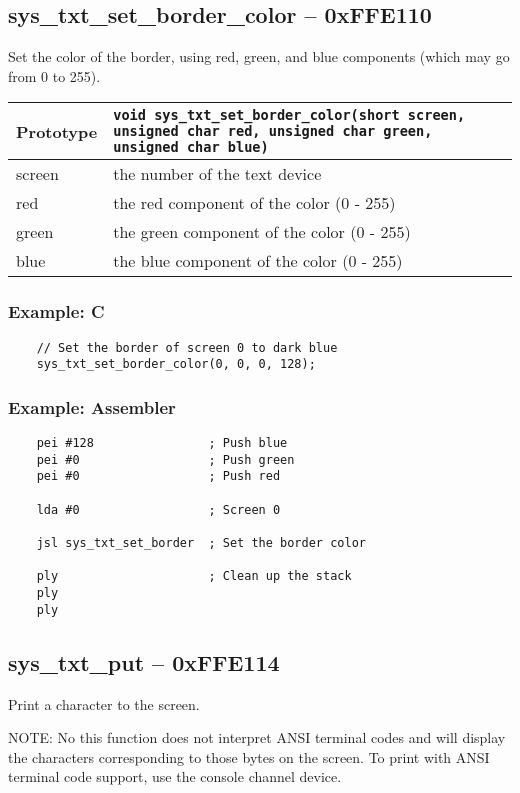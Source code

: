 \subsection*{sys\_txt\_set\_border\_color -- 0xFFE110}
Set the color of the border, using red, green, and blue components (which may go from 0 to 255).

\bigskip

\begin{tabular}{|l||l|} \hline
Prototype & \lstinline!void sys_txt_set_border_color(short screen, unsigned char red, unsigned char green, unsigned char blue)! \\ \hline
screen & the number of the text device \\ \hline
red & the red component of the color (0 - 255) \\ \hline
green & the green component of the color (0 - 255) \\ \hline
blue & the blue component of the color (0 - 255) \\ \hline
\end{tabular}

\subsubsection*{Example: C}
\begin{lstlisting}
    // Set the border of screen 0 to dark blue
    sys_txt_set_border_color(0, 0, 0, 128);
\end{lstlisting}

\subsubsection*{Example: Assembler}
\begin{verbatim}
    pei #128                ; Push blue
    pei #0                  ; Push green
    pei #0                  ; Push red

    lda #0                  ; Screen 0

    jsl sys_txt_set_border  ; Set the border color

    ply                     ; Clean up the stack
    ply
    ply
\end{verbatim}

\subsection*{sys\_txt\_put -- 0xFFE114}
Print a character to the screen.

NOTE: No this function does not interpret ANSI terminal codes and will display
the characters corresponding to those bytes on the screen. To print with ANSI
terminal code support, use the console channel device.

